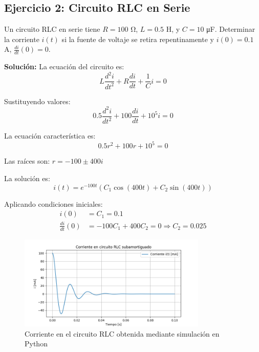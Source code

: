 \documentclass[12pt]{article}
\begin{document}
\subsection{Ejercicio 2: Circuito RLC en Serie}

Un circuito RLC en serie tiene $R = 100$ Ω, $L = 0.5$ H, y $C = 10$ μF. Determinar la corriente $i(t)$ si la fuente de voltaje se retira repentinamente y $i(0) = 0.1$ A, $\frac{di}{dt}(0) = 0$.

\textbf{Solución:}
La ecuación del circuito es:
\begin{equation}
    L \frac{d^2 i}{dt^2} + R \frac{di}{dt} + \frac{1}{C} i = 0
\end{equation}

Sustituyendo valores:
\begin{equation}
    0.5 \frac{d^2 i}{dt^2} + 100 \frac{di}{dt} + 10^5 i = 0
\end{equation}

La ecuación característica es:
\begin{equation}
    0.5r^2 + 100r + 10^5 = 0
\end{equation}

Las raíces son: $r = -100 \pm 400i$

La solución es:
\begin{equation}
    i(t) = e^{-100t} (C_1 \cos(400t) + C_2 \sin(400t))
\end{equation}

Aplicando condiciones iniciales:
\begin{align}
    i(0) &= C_1 = 0.1 \\
    \frac{di}{dt}(0) &= -100C_1 + 400C_2 = 0 \Rightarrow C_2 = 0.025
\end{align}

\begin{figure}[H]
    \centering
    \includegraphics[width=0.8\textwidth]{imagen-ejercicio2.png}
    \caption{Corriente en el circuito RLC obtenida mediante simulación en Python}
\end{figure}
\end{document}
